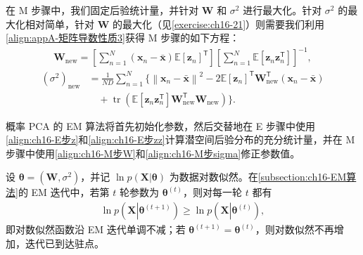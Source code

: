 \documentclass[../../main.tex]{subfiles}
\begin{document}
在 M 步骤中，我们固定后验统计量，并针对 $\bm{W}$ 和 $\sigma^2$ 进行最大化。针对 $\sigma^2$ 的最大化相对简单，针对 $\bm{W}$ 的最大化（见\cref{exercise:ch16-21}）则需要我们利用\eqref{align:appA-矩阵导数性质3}获得 M 步骤的如下方程：
\begin{align}
  \bm{W}_{\text{new}}=\left[\sum_{n=1}^{N}(\bm{x}_n-\bar{\bm{x}})\mathbb{E}[\bm{z}_n]^{\mathsf T}\right]\left[\sum_{n=1}^{N}\mathbb{E}[\bm{z}_n\bm{z}_n^{\mathsf T}]\right]^{-1},
  \label{align:ch16-M步W}
\end{align}
\begin{align}
  \left(\sigma^2\right)_{\text{new}}&=\frac{1}{ND}\sum_{n=1}^{N}\Bigg\{\left\|\bm{x}_n-\bar{\bm{x}}\right\|^2-2\mathbb{E}[\bm{z}_n]^{\mathsf T}\bm{W}_{\text{new}}^{\mathsf T}(\bm{x}_n-\bar{\bm{x}})\nonumber\\
  &\quad+\operatorname{tr}\left(\mathbb{E}[\bm{z}_n\bm{z}_n^{\mathsf T}]\bm{W}_{\text{new}}^{\mathsf T}\bm{W}_{\text{new}}\right)\Bigg\}.
  \label{align:ch16-M步sigma}
\end{align}

概率 PCA 的 EM 算法将首先初始化参数，然后交替地在 E 步骤中使用\eqref{align:ch16-E步z}和\eqref{align:ch16-E步zz}计算潜空间后验分布的充分统计量，并在 M 步骤中使用\eqref{align:ch16-M步W}和\eqref{align:ch16-M步sigma}修正参数值。

\begin{proposition}\label{proposition:ch16-EM单调性}
设 $\bm{\theta}=(\bm{W},\sigma^2)$，并记 $\ln p(\bm{X}|\bm{\theta})$ 为数据对数似然。在\cref{subsection:ch16-EM算法}的 EM 迭代中，若第 $t$ 轮参数为 $\bm{\theta}^{(t)}$，则对每一轮 $t$ 都有
\begin{align*}
  \ln p\left(\bm{X}\left|\bm{\theta}^{(t+1)}\right.\right)\geqslant\ln p\left(\bm{X}\left|\bm{\theta}^{(t)}\right.\right),
\end{align*}
即对数似然函数沿 EM 迭代单调不减；若 $\bm{\theta}^{(t+1)}=\bm{\theta}^{(t)}$，则对数似然不再增加，迭代已到达驻点。
\end{proposition}
\end{document}

